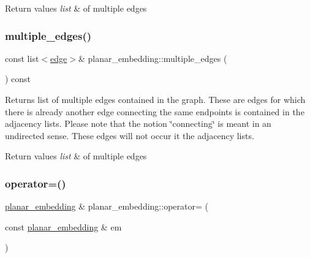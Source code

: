 \begin{DoxyRetVals}{Return values}
{\em list} & of multiple edges \\
\hline
\end{DoxyRetVals}
\mbox{\label{classplanar__embedding_aebec933f9aac54914ee7439028e37418}} 
\subsubsection{\texorpdfstring{multiple\+\_\+edges()}{multiple\_edges()}\hspace{0.1cm}{\footnotesize\ttfamily [2/2]}}
{\footnotesize\ttfamily const list$<$\mbox{\hyperlink{classedge}{edge}}$>$\& planar\+\_\+embedding\+::multiple\+\_\+edges (\begin{DoxyParamCaption}{ }\end{DoxyParamCaption}) const\hspace{0.3cm}{\ttfamily [inline]}}

Returns list of multiple edges contained in the graph. These are edges for which there is already another edge connecting the same endpoints is contained in the adjacency lists. Please note that the notion \char`\"{}connecting\char`\"{} is meant in an undirected sense. These edges will not occur it the adjacency lists.


\begin{DoxyRetVals}{Return values}
{\em list} & of multiple edges \\
\hline
\end{DoxyRetVals}
\mbox{\label{classplanar__embedding_afb772a5c6a3a03fafa6bbc17a4c42a23}} 
\subsubsection{\texorpdfstring{operator=()}{operator=()}}
{\footnotesize\ttfamily \mbox{\hyperlink{classplanar__embedding}{planar\+\_\+embedding}} \& planar\+\_\+embedding\+::operator= (\begin{DoxyParamCaption}\item[{const \mbox{\hyperlink{classplanar__embedding}{planar\+\_\+embedding}} \&}]{em }\end{DoxyParamCaption})}

